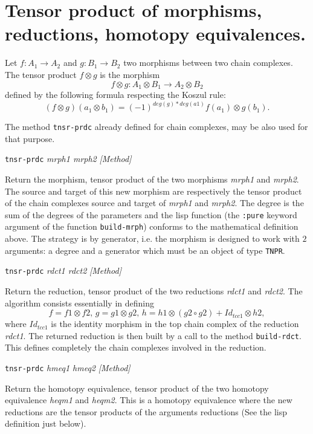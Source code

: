 \section{Tensor product of morphisms, reductions, homotopy equivalences.}

Let 
$f:A_1 \longrightarrow A_2$ and $g:B_1 \longrightarrow B_2$ two morphisms between 
two chain complexes. The tensor product $f \otimes g$ is the morphism
$$f\otimes g : A_1\otimes B_1 \longrightarrow A_2\otimes B_2$$ 
defined by the following formula respecting the Koszul rule:
$$ (f\otimes g) (a_1 \otimes b_1)= (-1)^{deg(g)*deg(a1)}f(a_1) \otimes g(b_1).$$

The method {\tt tnsr-prdc} already defined for chain complexes, may be also used for that purpose. 
\vskip 0.45cm
{\parindent=0mm
{\leftskip=5mm 
{\tt tnsr-prdc} {\em mrph1 mrph2} \hfill {\em [Method]} \par}
{\leftskip=15mm 
Return the morphism, tensor product of the two morphisms {\em mrph1} and {\em mrph2}. The source
and target of this new morphism are res\-pec\-ti\-ve\-ly the tensor product of the chain complexes source
and target of {\em mrph1} and {\em mrph2}. The degree is the sum of the degrees of the parameters
and the lisp function (the {\tt :pure} keyword argument of the function {\tt build-mrph})
conforms to the mathematical definition above.  The strategy is by generator, i.e. the morphism
is designed to work with $2$ arguments: a degree and a generator which must be
an object of type {\tt TNPR}. \par}
{\leftskip=5mm 
{\tt tnsr-prdc} {\em rdct1 rdct2} \hfill {\em [Method]} \par}
{\leftskip=15mm 
Return the reduction, 
tensor product of the two reductions {\em rdct1} and {\em rdct2}. The
algorithm consists essentially in defining
$$f=f1 \otimes f2,\, g=g1 \otimes g2,\, h= h1 \otimes (g2 \circ g2) + Id_{tcc1} \otimes h2,$$
where $Id_{tcc1}$ is the identity morphism in the top chain complex of the reduction {\em rdct1}.
The returned reduction is then built by a call to the method {\tt build-rdct}.
This defines completely the chain complexes involved in the reduction. \par}
{\leftskip=5mm 
{\tt tnsr-prdc} {\em hmeq1 hmeq2} \hfill {\em [Method]} \par}
{\leftskip=15mm 
Return 
the homotopy equivalence, tensor product of the two homotopy equivalence {\em heqm1} and {\em heqm2}. 
This is a homotopy equivalence where the new reductions are the tensor products of the arguments reductions
(See the lisp definition just below). \par}
}


